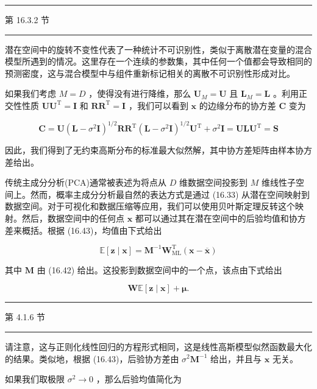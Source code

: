 \documentclass[10pt]{article}
\newcommand{\HRule}{\begin{center}\rule{0.9\linewidth}{0.2mm}\end{center}}
\begin{document}
\HRule

第 16.3.2 节

\HRule

潜在空间中的旋转不变性代表了一种统计不可识别性，类似于离散潜在变量的混合模型所遇到的情况。这里存在一个连续的参数集，其中任何一个值都会导致相同的预测密度，这与混合模型中与组件重新标记相关的离散不可识别性形成对比。

如果我们考虑 \(M = D\) ，使得没有进行降维，那么 \({\mathbf{U}}_{M} = \mathbf{U}\) 且 \({\mathbf{L}}_{M} = \mathbf{L}\) 。利用正交性性质 \(\mathbf{U}{\mathbf{U}}^{\mathrm{T}} = \mathbf{I}\) 和 \({\mathbf{{RR}}}^{\mathrm{T}} = \mathbf{I}\) ，我们可以看到 \(\mathbf{x}\) 的边缘分布的协方差 \(\mathbf{C}\) 变为

\[
\mathbf{C} = \mathbf{U}{\left( \mathbf{L} - {\sigma }^{2}\mathbf{I}\right) }^{1/2}\mathbf{R}{\mathbf{R}}^{\mathrm{T}}{\left( \mathbf{L} - {\sigma }^{2}\mathbf{I}\right) }^{1/2}{\mathbf{U}}^{\mathrm{T}} + {\sigma }^{2}\mathbf{I} = \mathbf{U}\mathbf{L}{\mathbf{U}}^{\mathrm{T}} = \mathbf{S} \tag{16.48}
\]

因此，我们得到了无约束高斯分布的标准最大似然解，其中协方差矩阵由样本协方差给出。

传统主成分分析(PCA)通常被表述为将点从 \(D\) 维数据空间投影到 \(M\) 维线性子空间上。然而，概率主成分分析最自然的表达方式是通过 (16.33) 从潜在空间映射到数据空间。对于可视化和数据压缩等应用，我们可以使用贝叶斯定理反转这个映射。然后，数据空间中的任何点 \(\mathbf{x}\) 都可以通过其在潜在空间中的后验均值和协方差来概括。根据 (16.43)，均值由下式给出

\[
\mathbb{E}\left\lbrack  {\mathbf{z} \mid  \mathbf{x}}\right\rbrack   = {\mathbf{M}}^{-1}{\mathbf{W}}_{\mathrm{{ML}}}^{\mathrm{T}}\left( {\mathbf{x} - \overline{\mathbf{x}}}\right)  \tag{16.49}
\]

其中 \(\mathbf{M}\) 由 (16.42) 给出。这投影到数据空间中的一个点，该点由下式给出

\[
\mathbf{W}\mathbb{E}\left\lbrack  {\mathbf{z} \mid  \mathbf{x}}\right\rbrack   + \mathbf{\mu }. \tag{16.50}
\]

\HRule

第 4.1.6 节

\HRule

请注意，这与正则化线性回归的方程形式相同，这是线性高斯模型似然函数最大化的结果。类似地，根据 (16.43)，后验协方差由 \({\sigma }^{2}{\mathbf{M}}^{-1}\) 给出，并且与 \(\mathbf{x}\) 无关。

如果我们取极限 \({\sigma }^{2} \rightarrow  0\) ，那么后验均值简化为
\end{document}
